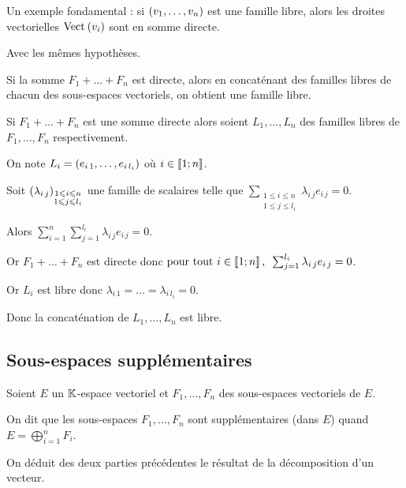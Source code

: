 Un exemple fondamental : si \(\left(v_1,\dots,v_n\right)\) est une famille libre, alors les droites vectorielles \(\Vect{v_i}\) sont en somme directe.

\begin{prop}
Avec les mêmes hypothèses.

Si la somme \(F_1+\dots+F_n\) est directe, alors en concaténant des familles libres de chacun des sous-espaces vectoriels, on obtient une famille libre.
\end{prop}

\begin{dem}
Si \(F_1+\dots+F_n\) est une somme directe alors soient \(L_1,\dots,L_n\) des familles libres de \(F_1,\dots,F_n\) respectivement.

On note \(L_i=\left(e_{i\,1},\dots,e_{i\,l_i}\right)\) où \(i\in\left\llbracket1;n\right\rrbracket\).

Soit \(\left(\lambda_{i\,j}\right)_{\substack{1\leqslant i\leqslant n \\ 1\leqslant j\leqslant l_i}}\) une famille de scalaires telle que \(\sum_{\substack{1\leq i\leq n \\ 1\leq j\leq l_i}}\lambda_{i\,j}e_{i\,j}=0\).

Alors \(\sum_{i=1}^n\sum_{j=1}^{l_i}\lambda_{i\,j}e_{i\,j}=0\).

Or \(F_1+\dots+F_n\) est directe donc \(\quantifs{\tpt i\in\interventierii{1}{n}}\sum_{j=1}^{l_i}\lambda_{i\,j}e_{i\,j}=0\).

Or \(L_i\) est libre donc \(\lambda_{i\,1}=\dots=\lambda_{i\,l_i}=0\).

Donc la concaténation de \(L_1,\dots,L_n\) est libre.
\end{dem}

\subsection{Sous-espaces supplémentaires}

\begin{defi}
Soient \(E\) un \(\mathbb{K}\)-espace vectoriel et \(F_1,\dots,F_n\) des sous-espaces vectoriels de \(E\).

On dit que les sous-espaces \(F_1,\dots,F_n\) sont supplémentaires (dans \(E\)) quand \(E=\bigoplus_{i=1}^nF_i\).
\end{defi}

On déduit des deux parties précédentes le résultat de la décomposition d'un vecteur.

